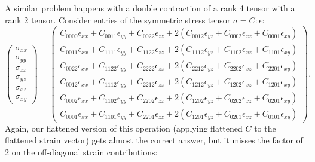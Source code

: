 \documentclass[10pt]{article}
\begin{document}
A similar problem happens with a double contraction of a rank 4 tensor with a
rank 2 tensor. Consider entries of the symmetric stress tensor $\sigma = C :
\epsilon$:
$$
\begin{pmatrix}
\sigma_{xx} \\
\sigma_{yy} \\
\sigma_{zz} \\
\sigma_{yz} \\
\sigma_{xz} \\
\sigma_{xy}
\end{pmatrix} =
\begin{pmatrix}
 C_{0000} \epsilon_{xx}+C_{0011} \epsilon_{yy}+C_{0022} \epsilon_{zz} +2 (C_{0012} \epsilon_{yz} + C_{0002} \epsilon_{xz}+ C_{0001} \epsilon_{xy}) \\
 C_{0011} \epsilon_{xx}+C_{1111} \epsilon_{yy}+C_{1122} \epsilon_{zz} +2 (C_{1112} \epsilon_{yz} + C_{1102} \epsilon_{xz}+ C_{1101} \epsilon_{xy}) \\
 C_{0022} \epsilon_{xx}+C_{1122} \epsilon_{yy}+C_{2222} \epsilon_{zz} +2 (C_{2212} \epsilon_{yz} + C_{2202} \epsilon_{xz}+ C_{2201} \epsilon_{xy}) \\
 C_{0012} \epsilon_{xx}+C_{1112} \epsilon_{yy}+C_{2212} \epsilon_{zz} +2 (C_{1212} \epsilon_{yz} + C_{1202} \epsilon_{xz}+ C_{1201} \epsilon_{xy}) \\
 C_{0002} \epsilon_{xx}+C_{1102} \epsilon_{yy}+C_{2202} \epsilon_{zz} +2 (C_{1202} \epsilon_{yz} + C_{0202} \epsilon_{xz}+ C_{0201} \epsilon_{xy}) \\
 C_{0001} \epsilon_{xx}+C_{1101} \epsilon_{yy}+C_{2201} \epsilon_{zz} +2 (C_{1201} \epsilon_{yz} + C_{0201} \epsilon_{xz}+ C_{0101} \epsilon_{xy})
\end{pmatrix}.
$$
Again, our flattened version of this operation (applying flattened $C$ to the flattened strain vector) gets almost the correct answer, but it misses
the factor of 2 on the off-diagonal strain contributions:
\end{document}
